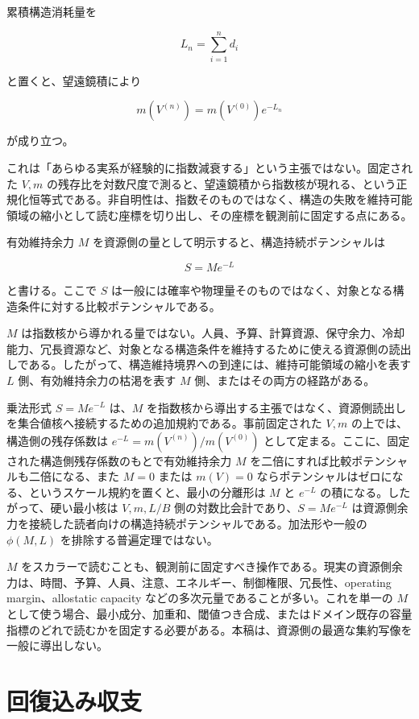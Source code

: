 \documentclass[12pt,a4paper]{article}
\begin{document}
累積構造消耗量を

\[
L_{n}=\sum_{i=1}^{n}d_{i}
\]

と置くと、望遠鏡積により

\[
m(V^{(n)})=m(V^{(0)})e^{-L_{n}}
\]

が成り立つ。

これは「あらゆる実系が経験的に指数減衰する」という主張ではない。固定された \(V,m\) の残存比を対数尺度で測ると、望遠鏡積から指数核が現れる、という正規化恒等式である。非自明性は、指数そのものではなく、構造の失敗を維持可能領域の縮小として読む座標を切り出し、その座標を観測前に固定する点にある。

有効維持余力 \(M\) を資源側の量として明示すると、構造持続ポテンシャルは

\[
S=Me^{-L}
\]

と書ける。ここで \(S\) は一般には確率や物理量そのものではなく、対象となる構造条件に対する比較ポテンシャルである。

\(M\) は指数核から導かれる量ではない。人員、予算、計算資源、保守余力、冷却能力、冗長資源など、対象となる構造条件を維持するために使える資源側の読出しである。したがって、構造維持境界への到達には、維持可能領域の縮小を表す \(L\) 側、有効維持余力の枯渇を表す \(M\) 側、またはその両方の経路がある。

乗法形式 \(S=Me^{-L}\) は、\(M\) を指数核から導出する主張ではなく、資源側読出しを集合値核へ接続するための追加規約である。事前固定された \(V,m\) の上では、構造側の残存係数は \(e^{-L}=m(V^{(n)})/m(V^{(0)})\) として定まる。ここに、固定された構造側残存係数のもとで有効維持余力 \(M\) を二倍にすれば比較ポテンシャルも二倍になる、また \(M=0\) または \(m(V)=0\) ならポテンシャルはゼロになる、というスケール規約を置くと、最小の分離形は \(M\) と \(e^{-L}\) の積になる。したがって、硬い最小核は \(V,m,L/B\) 側の対数比会計であり、\(S=Me^{-L}\) は資源側余力を接続した読者向けの構造持続ポテンシャルである。加法形や一般の \(\phi(M,L)\) を排除する普遍定理ではない。

\(M\) をスカラーで読むことも、観測前に固定すべき操作である。現実の資源側余力は、時間、予算、人員、注意、エネルギー、制御権限、冗長性、operating margin、allostatic capacity などの多次元量であることが多い。これを単一の \(M\) として使う場合、最小成分、加重和、閾値つき合成、またはドメイン既存の容量指標のどれで読むかを固定する必要がある。本稿は、資源側の最適な集約写像を一般に導出しない。

\section{回復込み収支}\label{ux56deux5fa9ux8fbcux307fux53ceux652f}
\end{document}
